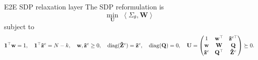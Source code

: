\documentclass[10pt,aspectratio=169]{beamer}
\newcommand{\Nassets}{N}
\newcommand{\Kcard}{k}
\newcommand{\Param}{\theta}
\newcommand{\SigmaMat}{\Sigma}
\newcommand{\diagv}{\operatorname{diag}}
\begin{document}
\begin{frame}{E2E SDP relaxation layer}
  \footnotesize
  The SDP reformulation is
  \[
    \min_\mathbf{U} \; \left\langle \SigmaMat_\Param, \mathbf{W} \right\rangle
  \]
  subject to
  \[
  \begin{aligned}
    \one^\top \mathbf{w} =1,\quad \one^\top \mathbf{\tilde z}^c=\Nassets-\Kcard, \quad \mathbf{w}, \mathbf{\tilde z}^c \ge 0, \quad 
    \diagv(\mathbf{\tilde Z}^c) =\mathbf{\tilde z}^c, 
    \quad
    \diagv(\mathbf{Q})=0,\quad
    \mathbf{U}  =
    \begin{pmatrix}
      1 & \mathbf{w}^\top & \mathbf{\tilde z}^{c\top}\\
      \mathbf{w} & \mathbf{W} & \mathbf{Q}\\
      \mathbf{\tilde z}^c & \mathbf{Q}^\top & \mathbf{\tilde Z}^c
    \end{pmatrix}   \succeq 0.
  \end{aligned}
  \]


\end{frame}
\end{document}
